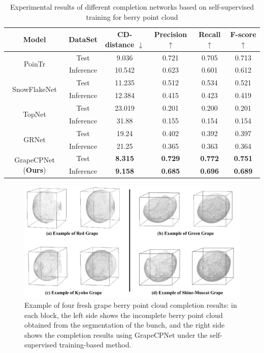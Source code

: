 \documentclass[12pt]{article}
\begin{document}
\begin{table}[h]
    \centering
    \caption{Experimental results of different completion networks based on self-supervised training for berry point cloud}
    \begin{tabular}{cccccc}
        \hline
        \textbf{Model} & \textbf{DataSet} & \textbf{CD-distance $\downarrow$} & \textbf{Precision $\uparrow$} & \textbf{Recall $\uparrow$} & \textbf{F-score $\uparrow$} \\
        \hline
        \multirow{2}{*}{PoinTr} & Test & 9.036 & 0.721 & 0.705 & 0.713 \\
        \cline{2-6}
        & Inference & 10.542 & 0.623 & 0.601 & 0.612 \\
        \hline
        \multirow{2}{*}{SnowFlakeNet} & Test & 11.235 & 0.512 & 0.534 & 0.521 \\
        \cline{2-6}
        & Inference & 12.384 & 0.415 & 0.423 & 0.419 \\
        \hline
        \multirow{2}{*}{TopNet} & Test & 23.019 & 0.201 & 0.200 & 0.201 \\
        \cline{2-6}
        & Inference & 31.88 & 0.155 & 0.154 & 0.154 \\
        \hline
        \multirow{2}{*}{GRNet} & Test & 19.24 & 0.402 & 0.392 & 0.397 \\
        \cline{2-6}
        & Inference & 21.25 & 0.365 & 0.363 & 0.364 \\
        \hline
        \multirow{2}{*}{GrapeCPNet (\textbf{Ours})} & Test & \textbf{8.315} & \textbf{0.729} & \textbf{0.772} & \textbf{0.751} \\
        \cline{2-6}
        & Inference & \textbf{9.158} & \textbf{0.685} & \textbf{0.696} & \textbf{0.689} \\
        \hline
    \end{tabular}
\end{table}

\begin{figure}[hbt!]
    \centering
    \includegraphics[width=1\textwidth]{figures/Figure12.pdf}
    \caption{Example of four fresh grape berry point cloud completion results: in each block, the left side shows the incomplete berry point cloud obtained from the segmentation of the bunch, and the right side shows the completion results using GrapeCPNet under the self-supervised training-based method.}
    \label{fig:raw14}
\end{figure}
\end{document}
